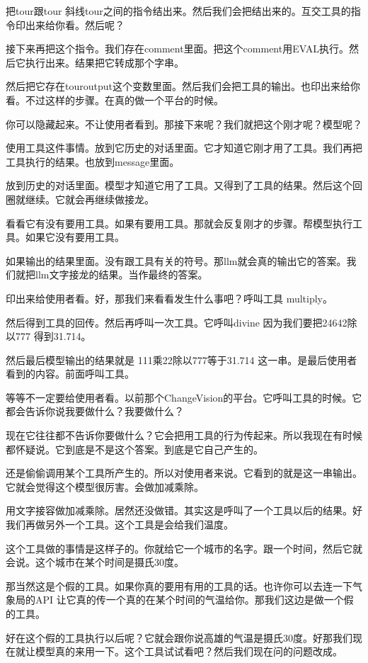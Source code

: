 \documentclass[12pt,a4paper]{article}
\begin{document}
把tour跟tour 斜线tour之间的指令结出来。然后我们会把结出来的。互交工具的指令印出来给你看。然后呢？

接下来再把这个指令。我们存在comment里面。把这个comment用EVAL执行。然后它执行出来。结果把它转成那个字串。

然后把它存在touroutput这个变数里面。然后我们会把工具的输出。也印出来给你看。不过这样的步骤。在真的做一个平台的时候。

你可以隐藏起来。不让使用者看到。那接下来呢？我们就把这个刚才呢？模型呢？

使用工具这件事情。放到它历史的对话里面。它才知道它刚才用了工具。我们再把工具执行的结果。也放到message里面。

放到历史的对话里面。模型才知道它用了工具。又得到了工具的结果。然后这个回圈就继续。它就会再继续做接龙。

看看它有没有要用工具。如果有要用工具。那就会反复刚才的步骤。帮模型执行工具。如果它没有要用工具。

如果输出的结果里面。没有跟工具有关的符号。那llm就会真的输出它的答案。我们就把llm文字接龙的结果。当作最终的答案。

印出来给使用者看。好，那我们来看看发生什么事吧？呼叫工具 multiply。

然后得到工具的回传。然后再呼叫一次工具。它呼叫divine 因为我们要把24642除以777 得到31.714。

然后最后模型输出的结果就是 111乘22除以777等于31.714 这一串。是最后使用者看到的内容。前面呼叫工具。

等等不一定要给使用者看。以前那个ChangeVision的平台。它呼叫工具的时候。它都会告诉你说我要做什么？我要做什么？

现在它往往都不告诉你要做什么？它会把用工具的行为传起来。所以我现在有时候都怀疑说。它到底是不是这个答案。到底是它自己产生的。

还是偷偷调用某个工具所产生的。所以对使用者来说。它看到的就是这一串输出。它就会觉得这个模型很厉害。会做加减乘除。

用文字接容做加减乘除。居然还没做错。其实这是呼叫了一个工具以后的结果。好我们再做另外一个工具。这个工具是会给我们温度。

这个工具做的事情是这样子的。你就给它一个城市的名字。跟一个时间，然后它就会说。这个城市在某个时间是摄氏30度。

那当然这是个假的工具。如果你真的要用有用的工具的话。也许你可以去连一下气象局的API 让它真的传一个真的在某个时间的气温给你。那我们这边是做一个假的工具。

好在这个假的工具执行以后呢？它就会跟你说高雄的气温是摄氏30度。好那我们现在就让模型真的来用一下。这个工具试试看吧？然后我们现在问的问题改成。
\end{document}
